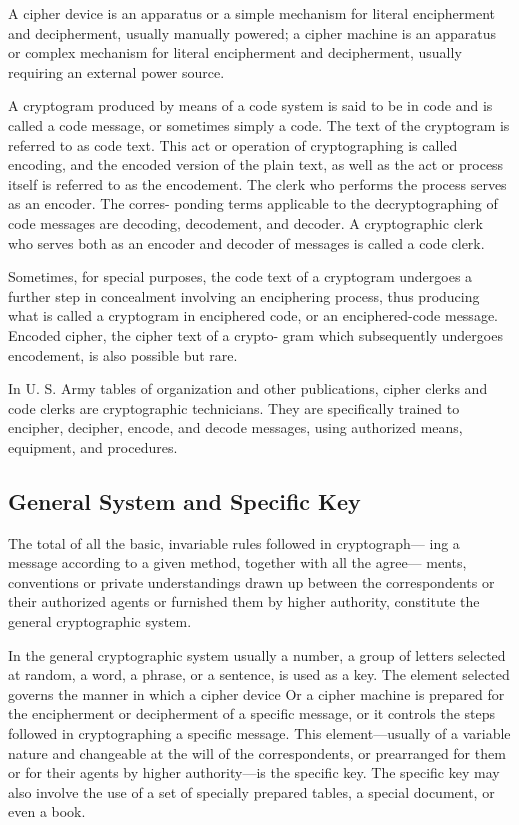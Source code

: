 \mypara A cipher device is an apparatus or a simple mechanism for literal
encipherment and decipherment, usually manually powered; a cipher
machine is an apparatus or complex mechanism for literal encipherment
and decipherment, usually requiring an external power source.

\mypara A cryptogram produced by means of a code system is said to be
in code and is called a code message, or sometimes simply a code. The
text of the cryptogram is referred to as code text. This act or operation
of cryptographing is called encoding, and the encoded version of the plain
text, as well as the act or process itself is referred to as the encodement.
The clerk who performs the process serves as an encoder. The corres-
ponding terms applicable to the decryptographing of code messages are
decoding, decodement, and decoder. A cryptographic clerk who serves
both as an encoder and decoder of messages is called a code clerk.

\mypara Sometimes, for special purposes, the code text of a cryptogram
undergoes a further step in concealment involving an enciphering process,
thus producing what is called a cryptogram in enciphered code, or an
enciphered-code message. Encoded cipher, the cipher text of a crypto-
gram which subsequently undergoes encodement, is also possible but rare.

\mypara In U. S. Army tables of organization and other publications, cipher
clerks and code clerks are cryptographic technicians. They are speciﬁcally
trained to encipher, decipher, encode, and decode messages, using
authorized means, equipment, and procedures.

\subsection{General System and Speciﬁc Key}

\mypara The total of all the basic, invariable rules followed in cryptograph—
ing a message according to a given method, together with all the agree—
ments, conventions or private understandings drawn up between the
correspondents or their authorized agents or furnished them by higher
authority, constitute the general cryptographic system.

\mypara In the general cryptographic system usually a number, a group of
letters selected at random, a word, a phrase, or a sentence, is used as a
key. The element selected governs the manner in which a cipher device
Or a cipher machine is prepared for the encipherment or decipherment
of a speciﬁc message, or it controls the steps followed in cryptographing
a specific message. This element—usually of a variable nature and
changeable at the will of the correspondents, or prearranged for them or
for their agents by higher authority—is the speciﬁc key. The speciﬁc key
may also involve the use of a set of specially prepared tables, a special
document, or even a book.

